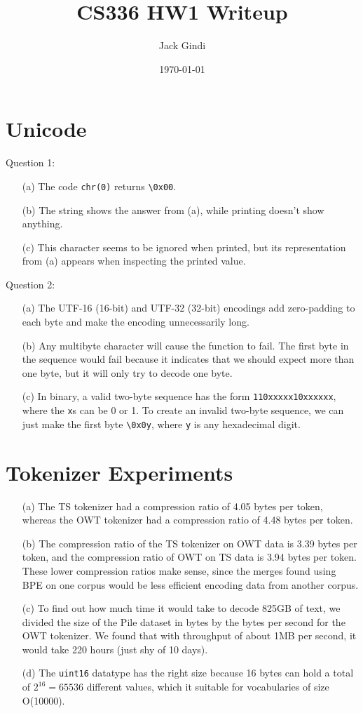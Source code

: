 \documentclass[11pt]{article}
\title{CS336 HW1 Writeup}
\author{Jack Gindi}
\date{\today}
\begin{document}
\maketitle

\section*{Unicode}
Question 1:
\begin{enumerate}
    \item[(a)] The code \texttt{chr(0)} returns \texttt{\textbackslash 0x00}.
    \item[(b)] The string shows the answer from (a), while printing doesn't show anything.
    \item[(c)] This character seems to be ignored when printed, but its representation from (a) appears when inspecting the printed value.
\end{enumerate}

\noindent Question 2:
\begin{enumerate}
    \item[(a)] The UTF-16 (16-bit) and UTF-32 (32-bit) encodings add zero-padding to each byte and make the encoding unnecessarily long.
    \item[(b)] Any multibyte character will cause the function to fail. The first byte in the sequence would fail because it indicates that we should expect more than one byte, but it will only try to decode one byte.
    \item[(c)] In binary, a valid two-byte sequence has the form \texttt{110xxxxx10xxxxxx}, where the \texttt{x}s can be 0 or 1. To create an invalid two-byte sequence, we can just make the first byte \texttt{\textbackslash 0x0y}, where \texttt{y} is any hexadecimal digit.
\end{enumerate}

\section*{Tokenizer Experiments}
\begin{enumerate}
    \item[(a)] The TS tokenizer had a compression ratio of 4.05 bytes per token, whereas the OWT tokenizer had a compression ratio of 4.48 bytes per token.
    \item[(b)] The compression ratio of the TS tokenizer on OWT data is 3.39 bytes per token, and the compression ratio of OWT on TS data is 3.94 bytes per token. These lower compression ratios make sense, since the merges found using BPE on one corpus would be less efficient encoding data from another corpus.
    \item[(c)] To find out how much time it would take to decode 825GB of text, we divided the size of the Pile dataset in bytes by the bytes per second for the OWT tokenizer. We found that with throughput of about 1MB per second, it would take 220 hours (just shy of 10 days).
    \item[(d)] The \texttt{uint16} datatype has the right size because 16 bytes can hold a total of $2^{16} = 65536$ different values, which it suitable for vocabularies of size O(10000).
\end{enumerate}
\end{document}
